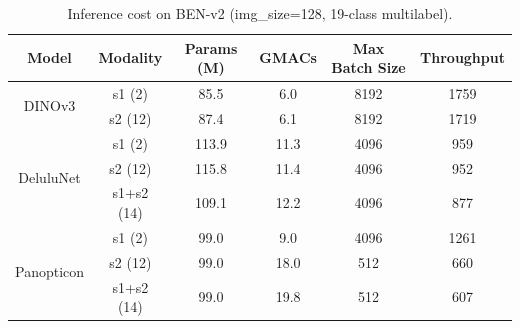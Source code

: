 \begin{table}[t]
\centering
\caption{Inference cost on BEN-v2 (img\_size=128, 19-class multilabel).}
\label{tab:computation}
\begin{tabular}{cccccc}
\toprule
Model & Modality & Params (M) & GMACs & Max Batch Size & Throughput \\
\midrule
\multirow{2}{*}{DINOv3} & s1 (2) & 85.5 & 6.0 & 8192 & 1759 \\
 & s2 (12) & 87.4 & 6.1 & 8192 & 1719 \\
\midrule
\multirow{3}{*}{DeluluNet} & s1 (2) & 113.9 & 11.3 & 4096 & 959 \\
 & s2 (12) & 115.8 & 11.4 & 4096 & 952 \\
 & s1+s2 (14) & 109.1 & 12.2 & 4096 & 877 \\
\midrule
\multirow{3}{*}{Panopticon} & s1 (2) & 99.0 & 9.0 & 4096 & 1261 \\
 & s2 (12) & 99.0 & 18.0 & 512 & 660 \\
 & s1+s2 (14) & 99.0 & 19.8 & 512 & 607 \\
\bottomrule
\end{tabular}
\end{table}
